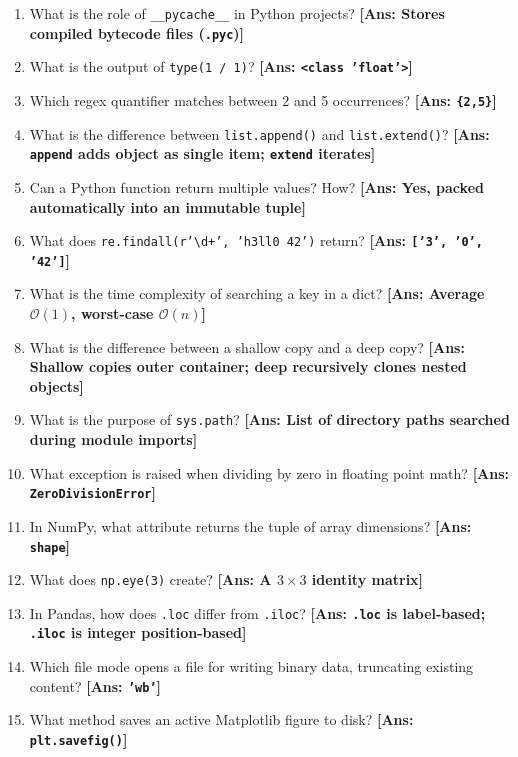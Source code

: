 \begin{enumerate}[label=\textbf{\arabic*.}]
    \item What is the role of \texttt{\_\_pycache\_\_} in Python projects? \hfill \textbf{[Ans: Stores compiled bytecode files (\texttt{.pyc})]}
    \item What is the output of \texttt{type(1 / 1)}? \hfill \textbf{[Ans: \texttt{<class 'float'>}]}
    \item Which regex quantifier matches between 2 and 5 occurrences? \hfill \textbf{[Ans: \texttt{\{2,5\}}]}
    \item What is the difference between \texttt{list.append()} and \texttt{list.extend()}? \hfill \textbf{[Ans: \texttt{append} adds object as single item; \texttt{extend} iterates]}
    \item Can a Python function return multiple values? How? \hfill \textbf{[Ans: Yes, packed automatically into an immutable tuple]}
    \item What does \texttt{re.findall(r'\textbackslash d+', 'h3ll0 42')} return? \hfill \textbf{[Ans: \texttt{['3', '0', '42']}]}
    \item What is the time complexity of searching a key in a dict? \hfill \textbf{[Ans: Average $\mathcal{O}(1)$, worst-case $\mathcal{O}(n)$]}
    \item What is the difference between a shallow copy and a deep copy? \hfill \textbf{[Ans: Shallow copies outer container; deep recursively clones nested objects]}
    \item What is the purpose of \texttt{sys.path}? \hfill \textbf{[Ans: List of directory paths searched during module imports]}
    \item What exception is raised when dividing by zero in floating point math? \hfill \textbf{[Ans: \texttt{ZeroDivisionError}]}
    \item In NumPy, what attribute returns the tuple of array dimensions? \hfill \textbf{[Ans: \texttt{shape}]}
    \item What does \texttt{np.eye(3)} create? \hfill \textbf{[Ans: A $3 \times 3$ identity matrix]}
    \item In Pandas, how does \texttt{.loc} differ from \texttt{.iloc}? \hfill \textbf{[Ans: \texttt{.loc} is label-based; \texttt{.iloc} is integer position-based]}
    \item Which file mode opens a file for writing binary data, truncating existing content? \hfill \textbf{[Ans: \texttt{'wb'}]}
    \item What method saves an active Matplotlib figure to disk? \hfill \textbf{[Ans: \texttt{plt.savefig()}]}
\end{enumerate}

